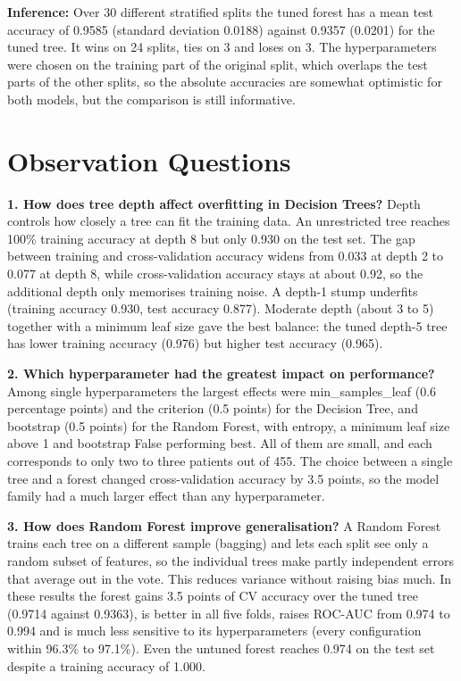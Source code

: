 \documentclass[11pt]{article}
\begin{document}
\textbf{Inference:} Over 30 different stratified splits the tuned forest has a mean test accuracy of 0.9585
(standard deviation 0.0188) against 0.9357 (0.0201) for the tuned tree. It wins on 24
splits, ties on 3 and loses on 3. The hyperparameters were chosen on the training part of
the original split, which overlaps the test parts of the other splits, so the absolute
accuracies are somewhat optimistic for both models, but the comparison is still informative.

\section*{Observation Questions}
\label{sec:orgfafc2d8}


\textbf{1. How does tree depth affect overfitting in Decision Trees?} Depth controls how closely a tree can fit the training data. An unrestricted tree reaches 100\% training accuracy at depth 8 but only 0.930 on the test set. The gap between training and cross-validation accuracy widens from 0.033 at depth 2 to 0.077 at depth 8, while cross-validation accuracy stays at about 0.92, so the additional depth only memorises training noise. A depth-1 stump underfits (training accuracy 0.930, test accuracy 0.877). Moderate depth (about 3 to 5) together with a minimum leaf size gave the best balance: the tuned depth-5 tree has lower training accuracy (0.976) but higher test accuracy (0.965).

\textbf{2. Which hyperparameter had the greatest impact on performance?} Among single hyperparameters the largest effects were min\_samples\_leaf (0.6 percentage points) and the criterion (0.5 points) for the Decision Tree, and bootstrap (0.5 points) for the Random Forest, with entropy, a minimum leaf size above 1 and bootstrap False performing best. All of them are small, and each corresponds to only two to three patients out of 455. The choice between a single tree and a forest changed cross-validation accuracy by 3.5 points, so the model family had a much larger effect than any hyperparameter.

\textbf{3. How does Random Forest improve generalisation?} A Random Forest trains each tree on a different sample (bagging) and lets each split see only a random subset of features, so the individual trees make partly independent errors that average out in the vote. This reduces variance without raising bias much. In these results the forest gains 3.5 points of CV accuracy over the tuned tree (0.9714 against 0.9363), is better in all five folds, raises ROC-AUC from 0.974 to 0.994 and is much less sensitive to its hyperparameters (every configuration within 96.3\% to 97.1\%). Even the untuned forest reaches 0.974 on the test set despite a training accuracy of 1.000.
\end{document}
